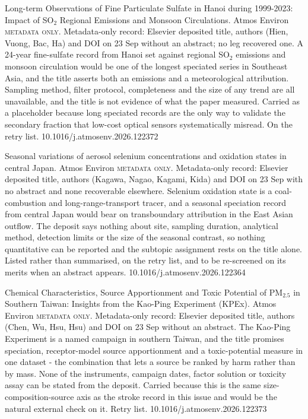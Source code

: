 \documentclass[10pt]{article}
\begin{document}
{Long-term Observations of Fine Particulate Sulfate in Hanoi during 1999-2023: Impact of SO$_2$ Regional Emissions and Monsoon Circulations.}
{Atmos Environ}
{\textsc{metadata only.} Metadata-only record: Elsevier deposited title, authors (Hien, Vuong, Bac, Ha) and DOI on 23 Sep without an abstract; no leg recovered one. A 24-year fine-sulfate record from Hanoi set against regional SO$_2$ emissions and monsoon circulation would be one of the longest speciated series in Southeast Asia, and the title asserts both an emissions and a meteorological attribution. Sampling method, filter protocol, completeness and the size of any trend are all unavailable, and the title is not evidence of what the paper measured. Carried as a placeholder because long speciated records are the only way to validate the secondary fraction that low-cost optical sensors systematically misread. On the retry list.}
{10.1016/j.atmosenv.2026.122372}

{Seasonal variations of aerosol selenium concentrations and oxidation states in central Japan.}
{Atmos Environ}
{\textsc{metadata only.} Metadata-only record: Elsevier deposited title, authors (Kagawa, Nagao, Kagami, Kida) and DOI on 23 Sep with no abstract and none recoverable elsewhere. Selenium oxidation state is a coal-combustion and long-range-transport tracer, and a seasonal speciation record from central Japan would bear on transboundary attribution in the East Asian outflow. The deposit says nothing about site, sampling duration, analytical method, detection limits or the size of the seasonal contrast, so nothing quantitative can be reported and the subtopic assignment rests on the title alone. Listed rather than summarised, on the retry list, and to be re-screened on its merits when an abstract appears.}
{10.1016/j.atmosenv.2026.122364}

{Chemical Characteristics, Source Apportionment and Toxic Potential of PM$_{2.5}$ in Southern Taiwan: Insights from the Kao-Ping Experiment (KPEx).}
{Atmos Environ}
{\textsc{metadata only.} Metadata-only record: Elsevier deposited title, authors (Chen, Wu, Hsu, Hsu) and DOI on 23 Sep without an abstract. The Kao-Ping Experiment is a named campaign in southern Taiwan, and the title promises speciation, receptor-model source apportionment and a toxic-potential measure in one dataset - the combination that lets a source be ranked by harm rather than by mass. None of the instruments, campaign dates, factor solution or toxicity assay can be stated from the deposit. Carried because this is the same size-composition-source axis as the stroke record in this issue and would be the natural external check on it. Retry list.}
{10.1016/j.atmosenv.2026.122373}
\end{document}
